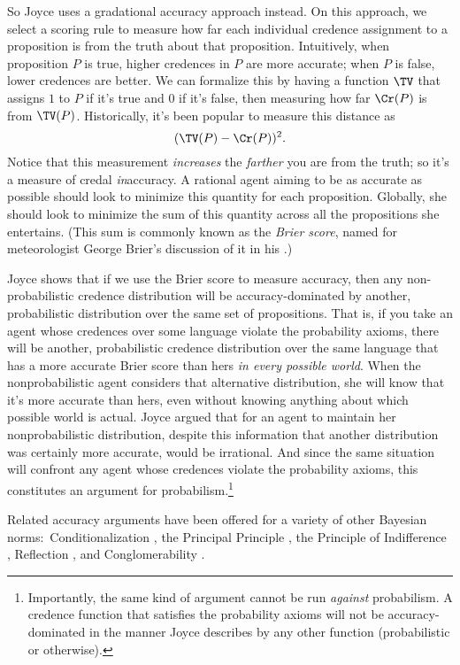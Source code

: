 So Joyce uses a gradational accuracy approach instead. On this approach, we select a scoring rule to measure how far each individual credence assignment to a proposition is from the truth about that proposition. Intuitively, when proposition $P$ is true, higher credences in $P$ are more accurate; when $P$ is false, lower credences are better. We can formalize this by having a function $\TV$ that assigns $1$ to $P$ if it's true and $0$ if it's false, then measuring how far $\Cr(P)$ is from $\TV(P)$. Historically, it's been popular to measure this distance as
\begin{equation}
(\TV(P)-\Cr(P))^2.
\end{equation}
Notice that this measurement \emph{increases} the \emph{farther} you are from the truth; so it's a measure of credal \emph{in}accuracy. A rational agent aiming to be as accurate as possible should look to minimize this quantity for each proposition. Globally, she should look to minimize the sum of this quantity across all the propositions she entertains. (This sum is commonly known as the \textit{Brier score}, named for meteorologist George Brier's discussion of it in his \citeyear{Brier}.)

Joyce shows that if we use the Brier score to measure accuracy, then any non-probabilistic credence distribution will be accuracy-dominated by another, probabilistic distribution over the same set of propositions. That is, if you take an agent whose credences over some language violate the probability axioms, there will be another, probabilistic credence distribution over the same language that has a more accurate Brier score than hers \emph{in every possible world}. When the nonprobabilistic agent considers that alternative distribution, she will know that it's more accurate than hers, even without knowing anything about which possible world is actual. Joyce argued that for an agent to maintain her nonprobabilistic distribution, despite this information that another distribution was certainly more accurate, would be irrational. And since the same situation will confront any agent whose credences violate the probability axioms, this constitutes an argument for probabilism.\footnote
{Importantly, the same kind of argument cannot be run \emph{against} probabilism. A credence function that satisfies the probability axioms will not be accuracy-dominated in the manner Joyce describes by any other function (probabilistic or otherwise).}

Related accuracy arguments have been offered for a variety of other Bayesian norms:\ Conditionalization \citep{GreavesWallace,BriggsPettigrew}, the Principal Principle \citep{PettigrewPrincipal}, the Principle of Indifference \citep{PettigrewIndifference}, Reflection \citep{EaswaranExpected}, and Conglomerability \citep{EaswaranExpected}.

